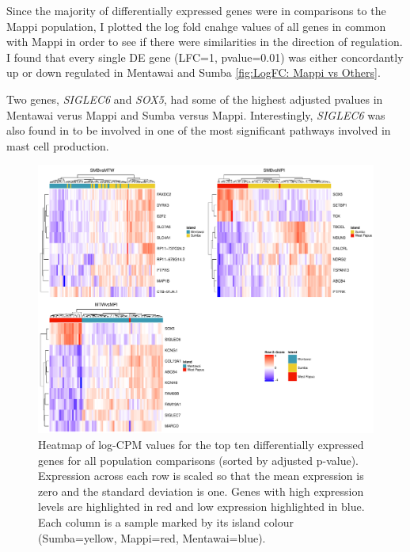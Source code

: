 \documentclass[12pt,a4paper,titlepage,twoside,openright]{book}
\begin{document}
\begin{mainmatter}
{{Since the majority of differentially expressed genes were in comparisons to the Mappi population, I plotted the log fold cnahge values of all genes in common with Mappi in order to see if there were similarities in the direction of regulation. I found that every single DE gene (LFC=1, pvalue=0.01) was either concordantly up or down regulated in Mentawai and Sumba \ref{fig:LogFC: Mappi vs Others}.

Two genes, \textit{SIGLEC6} and \textit{SOX5}, had some of the highest adjusted pvalues in Mentawai verus Mappi and Sumba versus Mappi. Interestingly, \textit{SIGLEC6} was also found in to be involved in one of the most significant pathways involved in mast cell production. 


\begin{figure}[htb!]
\centering
\includegraphics[width=\textwidth,height=\textheight,keepaspectratio]{Figures/HeatmapAllPops_dupCor.pdf}
\caption{Heatmap of log-CPM values for the top ten differentially expressed genes for all population comparisons (sorted by adjusted p-value). Expression across each row is scaled so that the mean expression is zero and the standard deviation is one. Genes with high expression levels are highlighted in red and low expression highlighted in blue. Each column is a sample marked by its island colour (Sumba=yellow, Mappi=red, Mentawai=blue).}
\label{fig:Heatmap Top Genes}
\end{figure}

}}
\end{mainmatter}
\end{document}
